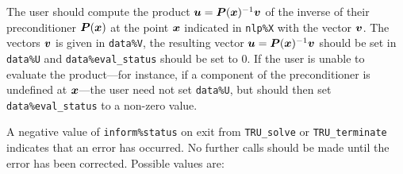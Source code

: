 \documentclass{galahad}
\newcommand{\packagename}{TRU}
\begin{document}
\begin{description}
 The user should compute the product ${\bm{u}} = {\bm{P}}({\bm{x}})^{-1}{\bm{v}}$
     of the inverse of their preconditioner ${\bm{P}}({\bm{x}})$ at the point ${\bm{x}}$
     indicated in {\tt nlp\%X} with the vector ${\bm{v}}$.
     The vectors ${\bm{v}}$ is given in {\tt data\%V}, the
     resulting vector ${\bm{u}} = {\bm{P}}({\bm{x}})^{-1}{\bm{v}}$ should be set in 
     {\tt data\%U} and {\tt data\%eval\_status}
     should be set to 0. If the user is unable to evaluate the product---for
     instance, if a component of the preconditioner is undefined at
     ${\bm{x}}$---the user need not set {\tt data\%U}, but should then set
     {\tt data\%eval\_status} to a non-zero value.

\end{description}



\galerrors
A negative value of {\tt inform\%status} on exit from
{\tt \packagename\_solve}
or
{\tt \packagename\_terminate}
indicates that an error has occurred. No further calls should be made
until the error has been corrected. Possible values are:
\end{document}
